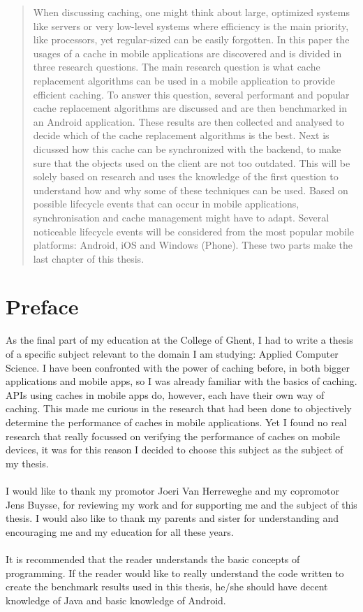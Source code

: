\documentclass[pdftex,a4paper,12pt,twoside]{report}
\begin{document}
\begin{abstract}
When discussing caching, one might think about large, optimized systems like servers or very low-level systems where efficiency is the main priority, like processors, yet regular-sized can be easily forgotten. In this paper the usages of a cache in mobile applications are discovered and is divided in three research questions. The main research question is what cache replacement algorithms can be used in a mobile application to provide efficient caching. To answer this question, several performant and popular cache replacement algorithms are discussed and are then benchmarked in an Android application. These results are then collected and analysed to decide which of the cache replacement algorithms is the best. Next is dicussed how this cache can be synchronized with the backend, to make sure that the objects used on the client are not too outdated. This will be solely based on research and uses the knowledge of the first question to understand how and why some of these techniques can be used. Based on possible lifecycle events that can occur in mobile applications, synchronisation and cache management might have to adapt. Several noticeable lifecycle events will be considered from the most popular mobile platforms: Android, iOS and Windows (Phone). These two parts make the last chapter of this thesis.
\end{abstract}

\chapter*{Preface}
\label{ch:voorwoord}
As the final part of my education at the College of Ghent, I had to write a thesis of a specific subject relevant to the domain I am studying: Applied Computer Science.
I have been confronted with the power of caching before, in both bigger applications and mobile apps, so I was already familiar with the basics of caching. APIs using caches in mobile apps do, however, each have their own way of caching. This made me curious in the research that had been done to objectively determine the performance of caches in mobile applications. Yet I found no real research that really focussed on verifying the performance of caches on mobile devices, it was for this reason I decided to choose this subject as the subject of my thesis.
\\\\
I would like to thank my promotor Joeri Van Herreweghe and my copromotor Jens Buysse, for reviewing my work and for supporting me and the subject of this thesis. I would also like to thank my parents and sister for understanding and encouraging me and my education for all these years.
\\\\
It is recommended that the reader understands the basic concepts of programming. If the reader would like to really understand the code written to create the benchmark results used in this thesis, he/she should have decent knowledge of Java and basic knowledge of Android.
\end{document}
